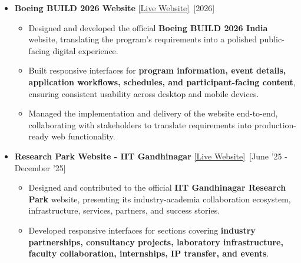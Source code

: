 \documentclass[a4paper,10pt]{article}
\newcommand{\isep}{-2 pt}
\begin{document}
\begin{itemize}\itemsep \isep



    \item \textbf{Boeing BUILD 2026 Website} \underline{\href{https://iieciitgn.com/build2026/}{[Live Website]}}\ \hfill [2026]\\[-0.7cm]

    \begin{itemize}\itemsep \isep

        \item Designed and developed the official \textbf{Boeing BUILD 2026 India}
        website, translating the program's requirements into a polished public-facing
        digital experience.

        \item Built responsive interfaces for \textbf{program information, event details,
        application workflows, schedules, and participant-facing content}, ensuring
        consistent usability across desktop and mobile devices.

        \item Managed the implementation and delivery of the website end-to-end,
        collaborating with stakeholders to translate requirements into production-ready
        web functionality.

    \end{itemize}



    \item \textbf{Research Park Website - IIT Gandhinagar} \underline{\href{https://iitgnrp.com}{[Live Website]}}\ \hfill [June '25 - December '25]\\[-0.7cm]

    \begin{itemize}\itemsep \isep

        \item Designed and contributed to the official \textbf{IIT Gandhinagar
        Research Park} website, presenting its industry-academia collaboration
        ecosystem, infrastructure, services, partners, and success stories.

        \item Developed responsive interfaces for sections covering
        \textbf{industry partnerships, consultancy projects, laboratory infrastructure,
        faculty collaboration, internships, IP transfer, and events}.


\end{itemize}
\end{itemize}
\end{document}
